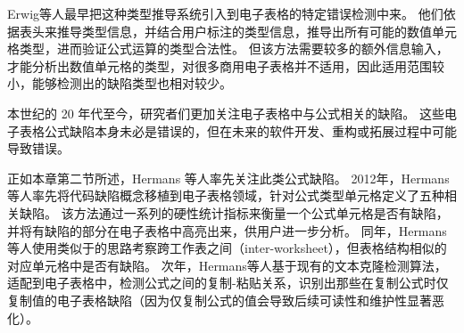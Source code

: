 Erwig等人\cite{erwig2002adding,abraham2004header,chambers2009automatic}最早把这种类型推导系统引入到电子表格的特定错误检测中来。
他们依据表头来推导类型信息，并结合用户标注的类型信息，推导出所有可能的数值单元格类型，进而验证公式运算的类型合法性。
但该方法需要较多的额外信息输入，才能分析出数值单元格的类型，对很多商用电子表格并不适用，因此适用范围较小，能够检测出的缺陷类型也相对较少。

本世纪的 20 年代至今，研究者们更加关注电子表格中与公式相关的缺陷。
这些电子表格公式缺陷本身未必是错误的，但在未来的软件开发、重构或拓展过程中可能导致错误。

正如本章第二节所述，Hermans 等人\cite{hermans2012detecting,hermans2012detecting2,hermans2013data}率先关注此类公式缺陷。
2012年，Hermans等人\cite{hermans2012detecting2}率先将代码缺陷概念移植到电子表格领域，针对公式类型单元格定义了五种相关缺陷。
该方法通过一系列的硬性统计指标来衡量一个公式单元格是否有缺陷，并将有缺陷的部分在电子表格中高亮出来，供用户进一步分析。
同年，Hermans等人\cite{hermans2012detecting}使用类似于\cite{hermans2012detecting2}的思路考察跨工作表之间（inter-worksheet），但表格结构相似的对应单元格中是否有缺陷。
次年，Hermans等人\cite{hermans2013data}基于现有的文本克隆检测算法，适配到电子表格中，检测公式之间的复制-粘贴关系，识别出那些在复制公式时仅复制值的电子表格缺陷（因为仅复制公式的值会导致后续可读性和维护性显著恶化）。


